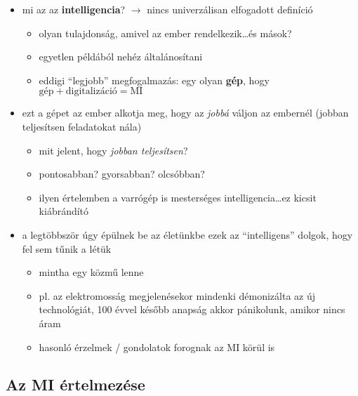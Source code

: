 \documentclass[a4paper, 11pt]{article}
\begin{document}
\begin{itemize}
	\item mi az az \textbf{intelligencia}? $\to$ nincs univerzálisan elfogadott definíció
	\begin{itemize}
		\item olyan tulajdonság, amivel az ember rendelkezik\dots és mások?
		\item egyetlen példából nehéz általánosítani
		\item eddigi ``legjobb'' megfogalmazás: egy olyan \textbf{gép}, hogy $\boxed{\text{gép} + \text{digitalizáció} = \text{MI}}$
	\end{itemize}
	\item ezt a gépet az ember alkotja meg, hogy az \textit{jobbá} váljon az embernél (jobban teljesítsen feladatokat nála)
	\begin{itemize}
		\item mit jelent, hogy \textit{jobban teljesítsen}?
		\item pontosabban? gyorsabban? olcsóbban?
		\item ilyen értelemben a varrógép is mesterséges intelligencia\dots ez kicsit kiábrándító
	\end{itemize}
	\item a legtöbbször úgy épülnek be az életünkbe ezek az ``intelligens'' dolgok, hogy fel sem tűnik a létük
	\begin{itemize}
		\item mintha egy közmű lenne
		\item pl. az elektromosság megjelenésekor mindenki démonizálta az új technológiát, 100 évvel később anapság akkor pánikolunk, amikor nincs áram
		\item hasonló érzelmek / gondolatok forognak az MI körül is
	\end{itemize}
\end{itemize}

\subsection{Az MI értelmezése}
\end{document}
